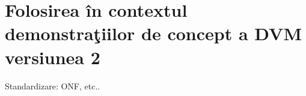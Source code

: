 \section{Folosirea în contextul demonstraţiilor de concept a DVM versiunea 2}

Standardizare: ONF, etc..